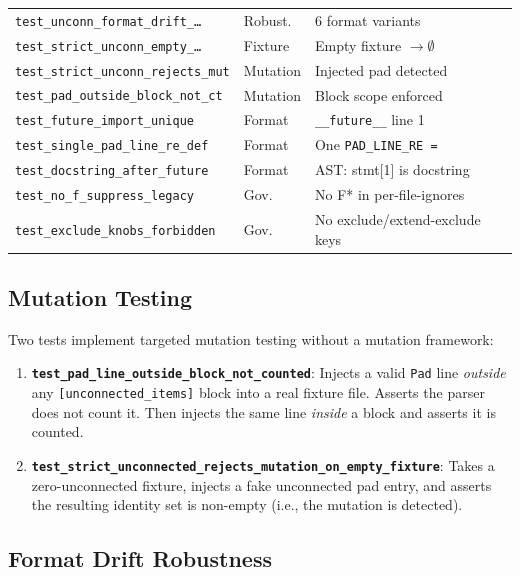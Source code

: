 \documentclass[11pt,a4paper]{article}
\begin{document}
{\begin{longtable}{@{}p{5.2cm}p{1.6cm}p{5.8cm}@{}}
\texttt{test\_unconn\_format\_drift\_\dots} & Robust. & 6 format variants \\
\texttt{test\_strict\_unconn\_empty\_\dots} & Fixture & Empty fixture $\to \emptyset$ \\
\texttt{test\_strict\_unconn\_rejects\_mut} & Mutation & Injected pad detected \\
\texttt{test\_pad\_outside\_block\_not\_ct} & Mutation & Block scope enforced \\
\texttt{test\_future\_import\_unique} & Format & \texttt{\_\_future\_\_} line 1 \\
\texttt{test\_single\_pad\_line\_re\_def} & Format & One \texttt{PAD\_LINE\_RE =} \\
\texttt{test\_docstring\_after\_future} & Format & AST: stmt[1] is docstring \\
\texttt{test\_no\_f\_suppress\_legacy} & Gov. & No F* in per-file-ignores \\
\texttt{test\_exclude\_knobs\_forbidden} & Gov. & No exclude/extend-exclude keys \\
\bottomrule
\end{longtable}
}

\subsection{Mutation Testing}
\label{sec:mutation}

Two tests implement targeted mutation testing without a mutation framework:

\begin{enumerate}
    \item \textbf{\texttt{test\_pad\_line\_outside\_block\_not\_counted}}: Injects a
          valid \texttt{Pad} line \emph{outside} any \texttt{[unconnected\_items]}
          block into a real fixture file. Asserts the parser does not count it.
          Then injects the same line \emph{inside} a block and asserts it is counted.
    \item \textbf{\texttt{test\_strict\_unconnected\_rejects\_mutation\_on\_empty\_fixture}}:
          Takes a zero-unconnected fixture, injects a fake unconnected pad entry,
          and asserts the resulting identity set is non-empty (i.e., the mutation
          is detected).
\end{enumerate}

\subsection{Format Drift Robustness}
\end{document}
